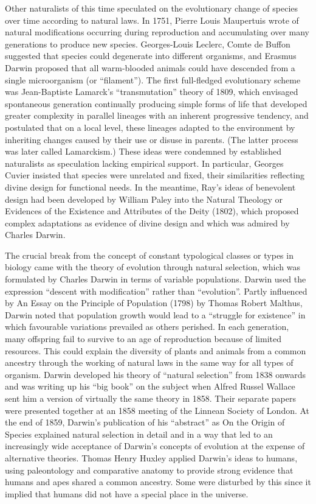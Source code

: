 Other naturalists of this time speculated on the evolutionary change of species over time according to natural laws. In 1751, Pierre Louis Maupertuis wrote of natural modifications occurring during reproduction and accumulating over many generations to produce new species. Georges-Louis Leclerc, Comte de Buffon suggested that species could degenerate into different organisms, and Erasmus Darwin proposed that all warm-blooded animals could have descended from a single microorganism (or ``filament''). The first full-fledged evolutionary scheme was Jean-Baptiste Lamarck's ``transmutation'' theory of 1809, which envisaged spontaneous generation continually producing simple forms of life that developed greater complexity in parallel lineages with an inherent progressive tendency, and postulated that on a local level, these lineages adapted to the environment by inheriting changes caused by their use or disuse in parents. (The latter process was later called Lamarckism.) These ideas were condemned by established naturalists as speculation lacking empirical support. In particular, Georges Cuvier insisted that species were unrelated and fixed, their similarities reflecting divine design for functional needs. In the meantime, Ray's ideas of benevolent design had been developed by William Paley into the Natural Theology or Evidences of the Existence and Attributes of the Deity (1802), which proposed complex adaptations as evidence of divine design and which was admired by Charles Darwin.

The crucial break from the concept of constant typological classes or types in biology came with the theory of evolution through natural selection, which was formulated by Charles Darwin in terms of variable populations. Darwin used the expression ``descent with modification'' rather than ``evolution''. Partly influenced by An Essay on the Principle of Population (1798) by Thomas Robert Malthus, Darwin noted that population growth would lead to a ``struggle for existence'' in which favourable variations prevailed as others perished. In each generation, many offspring fail to survive to an age of reproduction because of limited resources. This could explain the diversity of plants and animals from a common ancestry through the working of natural laws in the same way for all types of organism. Darwin developed his theory of ``natural selection'' from 1838 onwards and was writing up his ``big book'' on the subject when Alfred Russel Wallace sent him a version of virtually the same theory in 1858. Their separate papers were presented together at an 1858 meeting of the Linnean Society of London. At the end of 1859, Darwin's publication of his ``abstract'' as On the Origin of Species explained natural selection in detail and in a way that led to an increasingly wide acceptance of Darwin's concepts of evolution at the expense of alternative theories. Thomas Henry Huxley applied Darwin's ideas to humans, using paleontology and comparative anatomy to provide strong evidence that humans and apes shared a common ancestry. Some were disturbed by this since it implied that humans did not have a special place in the universe.


